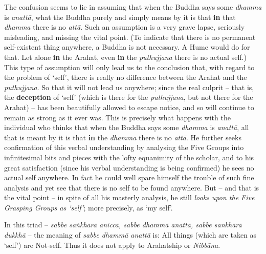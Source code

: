 The confusion seems to lie in assuming that when the Buddha says some \emph{dhamma} is \emph{anattā}, what the Buddha purely and simply means by it is that \textbf{in} that \emph{dhamma} there is no \emph{attā}. Such an assumption is a very grave lapse, seriously misleading, and missing the vital point. (To indicate that there is no permanent self-existent thing anywhere, a Buddha is not necessary. A Hume would do for that. Let alone \textbf{in} the Arahat, even \textbf{in} the \emph{puthujjana} there is no actual self.) This type of assumption will only lead us to the conclusion that, with regard to the problem of `self', there is really no difference between the Arahat and the \emph{puthujjana}. So that it will not lead us anywhere; since the real culprit -- that is, the \textbf{deception} of `self' (which is there for the \emph{puthujjana}, but not there for the Arahat) -- has been beautifully allowed to escape notice, and so will continue to remain as strong as it ever was. This is precisely what happens with the individual who thinks that when the Buddha says some \emph{dhamma} is \emph{anattā}, all that is meant by it is that \textbf{in} the \emph{dhamma} there is no \emph{attā}. He further seeks confirmation of this verbal understanding by analysing the Five Groups into infinitesimal bits and pieces with the lofty equanimity of the scholar, and to his great satisfaction (since his verbal understanding is being confirmed) he sees no actual self anywhere. In fact he could well spare himself the trouble of such fine analysis and yet see that there is no self to be found anywhere. But -- and that is the vital point -- in spite of all his masterly analysis, he still \emph{looks upon the Five Grasping Groups as `self'}; more precisely, as `my self'.

In this triad -- \emph{sabbe saṅkhārā aniccā, sabbe dhammā anattā, sabbe sankhārā dukkhā} -- the meaning of \emph{sabbe dhammā anattā} is: All things (which are taken as `self') are Not-self. Thus it does not apply to Arahatship or \emph{Nibbāna}.

